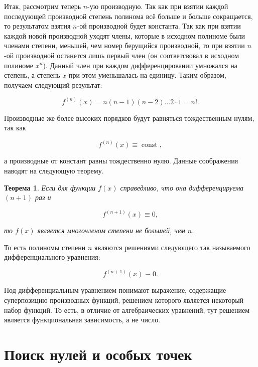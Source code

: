 \documentclass[12pt]{article}
\DeclareMathOperator\const{const}
\newtheorem{theorem}{Теорема}[section]
\begin{document}
Итак, рассмотрим теперь $n$\--ую производную. Так как при взятии каждой последующей производной степень полинома всё больше и больше сокращается, то результатом взятия $n$\--ой производной будет константа. Так как при взятии каждой новой производной уходят члены, которые в исходном полиноме были членами степени, меньшей, чем номер берущийся производной, то при взятии $n$\--ой производной останется лишь первый член (он соответсвовал в исходном полиноме $x^n$). Данный член при каждом дифференцировании умножался на степень, а степень $x$ при этом уменьшалась на единицу. Таким образом, получаем следующий результат:

\begin{equation}
	f^{(n)}(x) = n(n-1)(n-2)\ldots2\cdot 1 = n!.
\end{equation}

Производные же более высоких порядков будут равняться тождественным нулям, так как

\begin{equation}
	f^{(n)}(x) \equiv \const,
\end{equation}

а производные от констант равны тождественно нулю. Данные соображения наводят на следующую теорему.

\begin{theorem}
	Если для функции $f(x)$ справедливо, что она дифференцируема $(n+1)$ раз и

	\begin{equation}
		f^{(n+1)}(x) \equiv 0,
	\end{equation}

	то $f(x)$ является многочленом степени не большей, чем $n$.
\end{theorem}

То есть полиномы степени $n$ являются решениями следующего так называемого дифференциального уравнения:

\begin{equation}
		f^{(n+1)}(x) \equiv 0.
\end{equation}

Под дифференциальным уравнением понимают выражение, содержащие суперпозицию производных функций, решением которого является некоторый набор функций. То есть, в отличие от алгебраических уравнений, тут решением является функциональная зависимость, а не число.

\section{Поиск нулей и особых точек}
\end{document}
